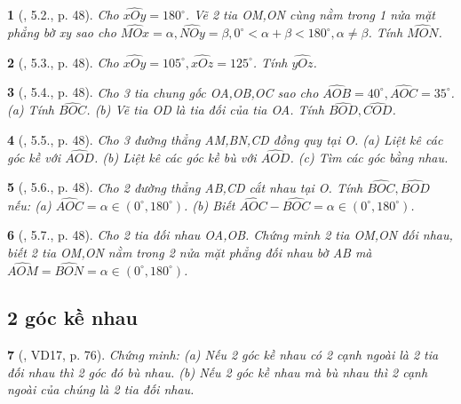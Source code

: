 \documentclass{article}
\newtheorem{baitoan}{}
\begin{document}
\begin{baitoan}[\cite{TLCT_THCS_Toan_6_hinh_hoc}, 5.2., p. 48]
	Cho $\widehat{xOy} = 180^\circ$. Vẽ 2 tia OM,ON cùng nằm trong 1 nửa mặt phẳng bờ xy sao cho $\widehat{MOx} = \alpha,\widehat{NOy} = \beta,0^\circ < \alpha + \beta < 180^\circ,\alpha\ne\beta$. Tính $\widehat{MON}$.
\end{baitoan}

\begin{baitoan}[\cite{TLCT_THCS_Toan_6_hinh_hoc}, 5.3., p. 48]
	Cho $\widehat{xOy} = 105^\circ,\widehat{xOz} = 125^\circ$. Tính $\widehat{yOz}$.
\end{baitoan}

\begin{baitoan}[\cite{TLCT_THCS_Toan_6_hinh_hoc}, 5.4., p. 48]
	Cho 3 tia chung gốc OA,OB,OC sao cho $\widehat{AOB} = 40^\circ,\widehat{AOC} = 35^\circ$. (a) Tính $\widehat{BOC}$. (b) Vẽ tia OD là tia đối của tia OA. Tính $\widehat{BOD},\widehat{COD}$.
\end{baitoan}

\begin{baitoan}[\cite{TLCT_THCS_Toan_6_hinh_hoc}, 5.5., p. 48]
	Cho 3 đường thẳng AM,BN,CD đồng quy tại O. (a) Liệt kê các góc kề với $\widehat{AOD}$. (b) Liệt kê các góc kề bù với $\widehat{AOD}$. (c) Tìm các góc bằng nhau.
\end{baitoan}

\begin{baitoan}[\cite{TLCT_THCS_Toan_6_hinh_hoc}, 5.6., p. 48]
	Cho 2 đường thẳng AB,CD cắt nhau tại O. Tính $\widehat{BOC},\widehat{BOD}$ nếu: (a) $\widehat{AOC} = \alpha\in(0^\circ,180^\circ)$. (b) Biết $\widehat{AOC} - \widehat{BOC} = \alpha\in(0^\circ,180^\circ)$.
\end{baitoan}

\begin{baitoan}[\cite{TLCT_THCS_Toan_6_hinh_hoc}, 5.7., p. 48]
	Cho 2 tia đối nhau OA,OB. Chứng minh 2 tia OM,ON đối nhau, biết 2 tia OM,ON nằm trong 2 nửa mặt phẳng đối nhau bờ AB mà $\widehat{AOM} = \widehat{BON} = \alpha\in(0^\circ,180^\circ)$.
\end{baitoan}


\subsection{2 góc kề nhau}

\begin{baitoan}[\cite{Binh_Toan_6_tap_2}, VD17, p. 76]
	Chứng minh: (a) Nếu 2 góc kề nhau có 2 cạnh ngoài là 2 tia đối nhau thì 2 góc đó bù nhau. (b) Nếu 2 góc kề nhau mà bù nhau thì 2 cạnh ngoài của chúng là 2 tia đối nhau.
\end{baitoan}
\end{document}

